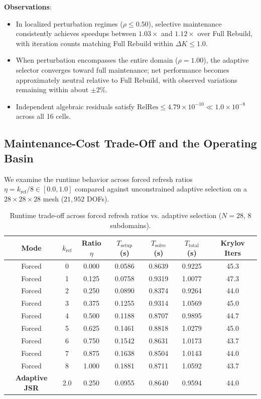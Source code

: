 \documentclass[preprint,12pt,3p]{elsarticle}
\begin{document}
\textbf{Observations}:
\begin{itemize}
    \item In localized perturbation regimes ($\rho \le 0.50$), selective maintenance consistently achieves speedups between $1.03\times$ and $1.12\times$ over Full Rebuild, with iteration counts matching Full Rebuild within $\Delta K \le 1.0$.
    \item When perturbation encompasses the entire domain ($\rho = 1.00$), the adaptive selector converges toward full maintenance; net performance becomes approximately neutral relative to Full Rebuild, with observed variations remaining within about $\pm 2\%$.
    \item Independent algebraic residuals satisfy $\text{RelRes} \le 4.79 \times 10^{-10} \ll 1.0 \times 10^{-8}$ across all 16 cells.
\end{itemize}

\subsection{Maintenance-Cost Trade-Off and the Operating Basin}
\label{subsec:res_tradeoff}
We examine the runtime behavior across forced refresh ratios $\eta = k_{\text{ref}}/8 \in [0.0, 1.0]$ compared against unconstrained adaptive selection on a $28 \times 28 \times 28$ mesh ($21,952$ DOFs).

\begin{table}[htbp]
\centering
\small
\caption{Runtime trade-off across forced refresh ratios vs. adaptive selection ($N=28$, 8 subdomains).}
\label{tab:pillar2_tradeoff}
\begin{tabular}{ccccccc}
\toprule
Mode & $k_{\text{ref}}$ & Ratio $\eta$ & $T_{\text{setup}}$ (s) & $T_{\text{solve}}$ (s) & $T_{\text{total}}$ (s) & Krylov Iters \\
\midrule
Forced & 0 & 0.000 & 0.0586 & 0.8639 & 0.9225 & 45.3 \\
Forced & 1 & 0.125 & 0.0758 & 0.9319 & 1.0077 & 47.3 \\
Forced & 2 & 0.250 & 0.0890 & 0.8374 & 0.9264 & 44.0 \\
Forced & 3 & 0.375 & 0.1255 & 0.9314 & 1.0569 & 45.0 \\
Forced & 4 & 0.500 & 0.1188 & 0.8707 & 0.9895 & 44.7 \\
Forced & 5 & 0.625 & 0.1461 & 0.8818 & 1.0279 & 45.0 \\
Forced & 6 & 0.750 & 0.1542 & 0.8631 & 1.0173 & 43.7 \\
Forced & 7 & 0.875 & 0.1638 & 0.8504 & 1.0143 & 44.0 \\
Forced & 8 & 1.000 & 0.1881 & 0.8711 & 1.0592 & 43.7 \\
\midrule
\textbf{Adaptive JSR} & 2.0 & 0.250 & 0.0955 & 0.8640 & 0.9594 & 44.0 \\
\bottomrule
\end{tabular}
\end{table}
\end{document}
